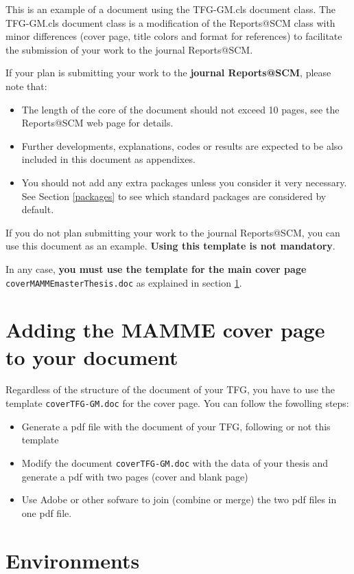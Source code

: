 \documentclass[12,twoside]{TFG-GM}
\theoremstyle{definition}
\theoremstyle{remark}
\begin{document}
This is an example of a document using the TFG-GM.cls document class. The TFG-GM.cls document class is a modification of the Reports@SCM class with minor differences (cover page, title colors and format for references) to facilitate the submission of your work to the journal Reports@SCM.

If your plan is submitting your work to the \textbf{journal Reports@SCM}, please note that:
\begin{itemize}
	\item The length of the core of the document should not exceed 10 pages, see the Reports@SCM web page for details.
	\item Further developments, explanations, codes or results are expected to be also included in this document as appendixes.
	\item You should not add any extra packages unless you consider it very necessary. See Section \ref{packages} to see which standard packages  are considered by default. 
\end{itemize} 

If you do not plan submitting your work to the journal  Reports@SCM, you can use this document as an example. \textbf{Using this template is not mandatory}.
 
In any case, \textbf{you must use the template for the main cover page} \texttt{coverMAMMEmasterThesis.doc} as explained in section \ref{sec:coverPage}.


\section{Adding the MAMME cover page to your document}
\label{sec:coverPage}
  
Regardless of the structure of the document of your TFG, you have to use the template \texttt{coverTFG-GM.doc} for the cover page. You can follow the fowolling steps:
\begin{itemize}
	\item Generate a pdf file with the document of your TFG, following or not this template
	\item Modify the document \texttt{coverTFG-GM.doc} with the data of your thesis and generate a pdf with two pages (cover and blank page)
	\item Use Adobe or other sofware to join (combine or merge) the two pdf files in one pdf file. 
\end{itemize}
 
\section{Environments}
\end{document}
